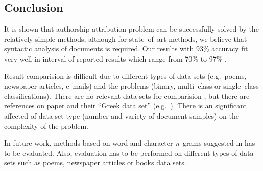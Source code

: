 \documentclass[11pt,english]{article}
\begin{document}
\begin{multicols}{2}
\section{Conclusion}
It is shown that authorship attribution problem can be successfully solved by
the relatively simple methods, although for state--of--art methods, we
believe that syntactic analysis of documents is required. Our results with
93\% accuracy fit very well in interval of reported results which range from
70\% to 97\% \citep{coyotl2006authorship,keselj2003n,luyckx2005shallow,stamatatos2001computer}.

Result comparision is difficult due to different types of data sets (e.g.\ poems,
newspaper articles, e--mails) and the problems (binary, multi--class or
single--class classifications). There are no relevant data sets for comparision
\citep{zhao2005effective}, but there are references on paper
\citep{stamatatos2001computer} and their ``Greek data set'' (e.g.\
\citep{keselj2003n}). There is an significant affected of data set type (number
and variety of document samples) on the complexity of the problem.

In future work, methods based on word and character \emph{n}--grams suggested
in \citep{keselj2003n,peng2003language,coyotl2006authorship} has to be
evaluated. Also, evaluation has to be performed on different types of data sets
such as poems, newspaper articles or books data sets.




\end{multicols}
\end{document}

